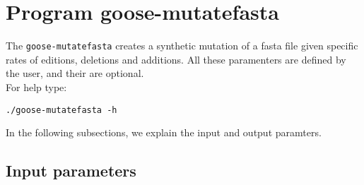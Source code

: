 \section{Program goose-mutatefasta}
The \texttt{goose-mutatefasta} creates a synthetic mutation of a fasta file given specific rates of editions, deletions and additions. All these paramenters are defined by the user, and their are optional.\\
For help type:
\begin{lstlisting}
./goose-mutatefasta -h
\end{lstlisting}
In the following subsections, we explain the input and output paramters.

\subsection*{Input parameters}

